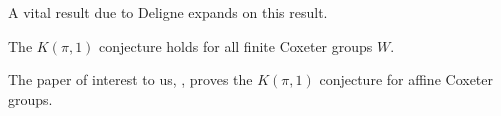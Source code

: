 \documentclass[class=article, crop=false]{standalone}
\begin{document}
A vital result due to Deligne expands on this result.
\begin{theorem}
	The $K(\pi,1)$ conjecture holds for all finite Coxeter groups $W$.
	\label{thm:k_pi_1_finite}
\end{theorem}

The paper of interest to us, \cite{paolini_salvetti_kpi1_2021}, proves the $K(\pi,1)$ conjecture for affine Coxeter groups. 
\end{document}
